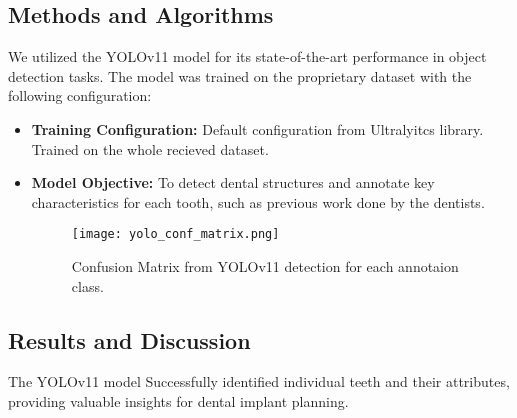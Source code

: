 \documentclass[12pt]{article}
\begin{document}
\subsection{Methods and Algorithms}
We utilized the YOLOv11 model for its state-of-the-art performance in object detection tasks. The model was trained on the proprietary dataset with the following configuration:
\begin{itemize}
    \item \textbf{Training Configuration:} Default configuration from Ultralyitcs library. Trained on the whole recieved dataset.
    \item \textbf{Model Objective:} To detect dental structures and annotate key characteristics for each tooth, such as previous work done by the dentists.
    \begin{figure}[H]
    \centering
    \texttt{[image: yolo\_conf\_matrix.png]}
    \caption{Confusion Matrix from YOLOv11 detection for each annotaion class.}
    \label{fig:yolo-output}
\end{figure}
\end{itemize}

\subsection{Results and Discussion}
The YOLOv11 model Successfully identified individual teeth and their attributes, providing valuable insights for dental implant planning.
\end{document}
